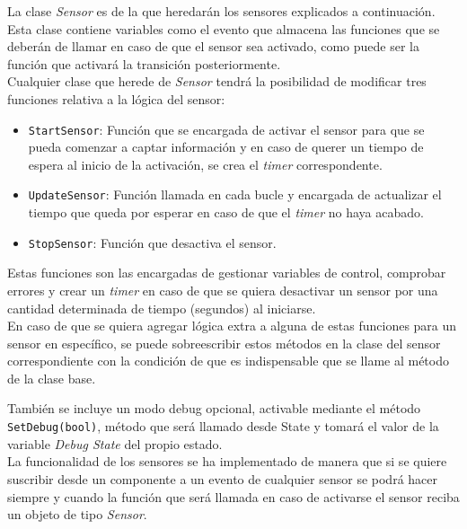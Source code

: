 La clase \textit{Sensor} es de la que heredarán los sensores explicados a continuación. Esta clase contiene variables como el evento que almacena las funciones que se deberán de llamar en caso de que el sensor sea activado, como puede ser la función que activará la transición posteriormente.\\

Cualquier clase que herede de \textit{Sensor} tendrá la posibilidad de modificar tres funciones relativa a la lógica del sensor:

\begin{itemize}
	\item \texttt{StartSensor}: Función que se encargada de activar el sensor para que se pueda comenzar a captar información y en caso de querer un tiempo de espera al inicio de la activación, se crea el \textit{timer} correspondente.
	\item \texttt{UpdateSensor}: Función llamada en cada bucle y encargada de actualizar el tiempo que queda por esperar en caso de que el \textit{timer} no haya acabado.
	\item \texttt{StopSensor}: Función que desactiva el sensor.
\end{itemize}
Estas funciones son las encargadas de gestionar variables de control, comprobar errores y crear un \textit{timer} en caso de que se quiera desactivar un sensor por una cantidad determinada de tiempo (segundos) al iniciarse.\\

En caso de que se quiera agregar lógica extra a alguna de estas funciones para un sensor en específico, se puede sobreescribir estos métodos en la clase del sensor correspondiente con la condición de que es indispensable que se llame al método de la clase base.

También se incluye un modo debug opcional, activable mediante el método \texttt{SetDebug(bool)}, método que será llamado desde State y tomará el valor de la variable \textit{Debug State} del propio estado.\\

La funcionalidad de los sensores se ha implementado de manera que si se quiere suscribir desde un componente a un evento de cualquier sensor se podrá hacer siempre y cuando la función que será llamada en caso de activarse el sensor reciba un objeto de tipo \textit{Sensor}.\\


